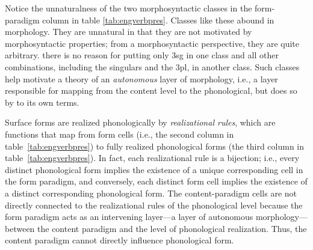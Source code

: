 Notice the unnaturalness of the two morphosyntactic classes in
the form-paradigm column in table \ref{tab:engverbpres}.
Classes like these abound in morphology.  
They are unnatural in that they are not motivated by morphosyntactic properties; from a morphosyntactic
perspective, they are quite arbitrary.
there is no reason for putting only 3sg in one class and all other combinations, 
including the singulars and the 3pl, in another class. Such classes help motivate 
a theory of an \emph{autonomous} layer of morphology, i.e., a layer responsible 
for mapping from the content level to the phonological, but does so by 
to its own terms.

Surface forms are realized phonologically by \emph{realizational rules}, which 
are functions that map from form cells (i.e., the second column in table~\ref{tab:engverbpres}) %
to fully realized phonological forms (the third column in table~\ref{tab:engverbpres}). In fact, each realizational rule is a bijection; i.e., every 
distinct phonological form implies the existence of a unique corresponding cell in 
the form paradigm, and conversely, each distinct form cell implies the existence of 
a distinct corresponding phonological form. The
content-paradigm cells are not directly connected to the realizational rules of 
the phonological level because the form paradigm acts as an 
intervening layer---a layer of autonomous morphology---between the 
content paradigm and the level of phonological realization. 
Thus, the content paradigm cannot directly influence phonological form. 


